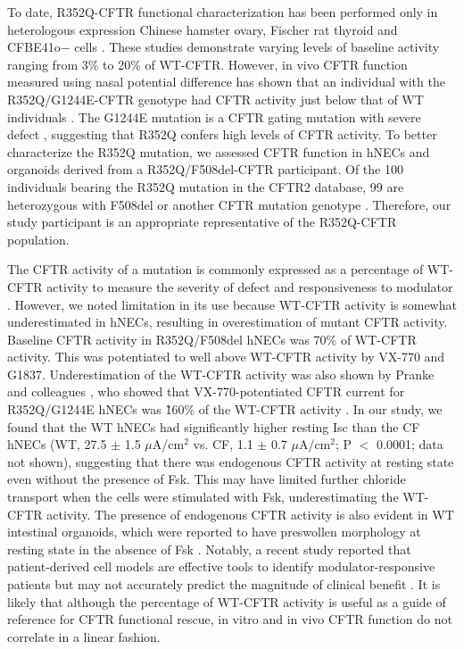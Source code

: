 To date, R352Q-CFTR functional characterization has been performed only in heterologous expression Chinese hamster ovary, Fischer rat thyroid and CFBE41o− cells \cite{guinamard1999, vangoor2014,veit2020 }. These studies demonstrate varying levels of baseline activity ranging from 3\% to 20\% of WT-CFTR. However, in vivo CFTR function measured using nasal potential difference has shown that an individual with the R352Q/G1244E-CFTR genotype had CFTR activity just below that of WT individuals \cite{pranke2017}. The G1244E mutation is a CFTR gating mutation with severe defect \cite{cftr2}, suggesting that R352Q confers high levels of CFTR activity. To better characterize the R352Q mutation, we assessed CFTR function in hNECs and organoids derived from a R352Q/F508del-CFTR participant. Of the 100 individuals bearing the R352Q mutation in the CFTR2 database, 99 are heterozygous with F508del or another CFTR mutation genotype \cite{cftr2}. Therefore, our study participant is an appropriate representative of the R352Q-CFTR population.

The CFTR activity of a mutation is commonly expressed as a percentage of WT-CFTR activity to measure the severity of defect and responsiveness to modulator \cite{pranke2017,vangoor2014}. However, we noted limitation in its use because WT-CFTR activity is somewhat underestimated in hNECs, resulting in overestimation of mutant CFTR activity. Baseline CFTR activity in R352Q/F508del hNECs was 70\% of WT-CFTR activity. This was potentiated to well above WT-CFTR activity by VX-770 and G1837. Underestimation of the WT-CFTR activity was also shown by Pranke and colleagues \cite{pranke2017}, who showed that VX-770-potentiated CFTR current for R352Q/G1244E hNECs was \~160\% of the WT-CFTR activity \cite{pranke2017}. In our study, we found that the WT hNECs had significantly higher resting Isc than the CF hNECs (WT, 27.5 $\pm$ 1.5 $\mu$A/cm$^2$ vs. CF, 1.1 $\pm$ 0.7 $\mu$A/cm$^2$; P $<$ 0.0001; data not shown), suggesting that there was endogenous CFTR activity at resting state even without the presence of Fsk. This may have limited further chloride transport when the cells were stimulated with Fsk, underestimating the WT-CFTR activity. The presence of endogenous CFTR activity is also evident in WT intestinal organoids, which were reported to have preswollen morphology at resting state in the absence of Fsk \cite{dekkers2016}. Notably, a recent study reported that patient-derived cell models are effective tools to identify modulator-responsive patients but may not accurately predict the magnitude of clinical benefit \cite{kerem2021}. It is likely that although the percentage of WT-CFTR activity is useful as a guide of reference for CFTR functional rescue, in vitro and in vivo CFTR function do not correlate in a linear fashion.

